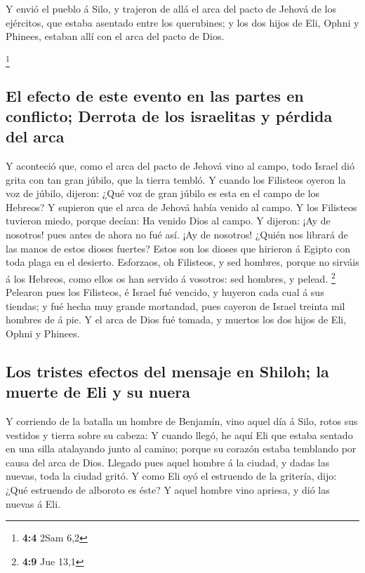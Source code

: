  Y envió el pueblo á Silo, y trajeron de allá el arca del
pacto de Jehová de los ejércitos, que estaba asentado entre los
querubines; y los dos hijos de Eli, Ophni y Phinees, estaban allí con el
arca del pacto de Dios.

\footnote{\textbf{4:4} 2Sam 6,2}

\hypertarget{el-efecto-de-este-evento-en-las-partes-en-conflicto-derrota-de-los-israelitas-y-puxe9rdida-del-arca}{%
\subsection{El efecto de este evento en las partes en conflicto; Derrota
de los israelitas y pérdida del
arca}\label{el-efecto-de-este-evento-en-las-partes-en-conflicto-derrota-de-los-israelitas-y-puxe9rdida-del-arca}}

 Y aconteció que, como el arca del pacto de Jehová vino al
campo, todo Israel dió grita con tan gran júbilo, que la tierra tembló.
 Y cuando los Filisteos oyeron la voz de júbilo, dijeron:
¿Qué voz de gran júbilo es esta en el campo de los Hebreos? Y supieron
que el arca de Jehová había venido al campo.  Y los
Filisteos tuvieron miedo, porque decían: Ha venido Dios al campo. Y
dijeron: ¡Ay de nosotros! pues antes de ahora no fué así. 
¡Ay de nosotros! ¿Quién nos librará de las manos de estos dioses
fuertes? Estos son los dioses que hirieron á Egipto con toda plaga en el
desierto.  Esforzaos, oh Filisteos, y sed hombres, porque no
sirváis á los Hebreos, como ellos os han servido á vosotros: sed
hombres, y pelead. \footnote{\textbf{4:9} Jue 13,1} 
Pelearon pues los Filisteos, é Israel fué vencido, y huyeron cada cual á
sus tiendas; y fué hecha muy grande mortandad, pues cayeron de Israel
treinta mil hombres de á pie.  Y el arca de Dios fué
tomada, y muertos los dos hijos de Eli, Ophni y Phinees.

\hypertarget{los-tristes-efectos-del-mensaje-en-shiloh-la-muerte-de-eli-y-su-nuera}{%
\subsection{Los tristes efectos del mensaje en Shiloh; la muerte de Eli
y su
nuera}\label{los-tristes-efectos-del-mensaje-en-shiloh-la-muerte-de-eli-y-su-nuera}}

 Y corriendo de la batalla un hombre de Benjamín, vino
aquel día á Silo, rotos sus vestidos y tierra sobre su cabeza:
 Y cuando llegó, he aquí Eli que estaba sentado en una
silla atalayando junto al camino; porque su corazón estaba temblando por
causa del arca de Dios. Llegado pues aquel hombre á la ciudad, y dadas
las nuevas, toda la ciudad gritó.  Y como Eli oyó el
estruendo de la gritería, dijo: ¿Qué estruendo de alboroto es éste? Y
aquel hombre vino apriesa, y dió las nuevas á Eli.

